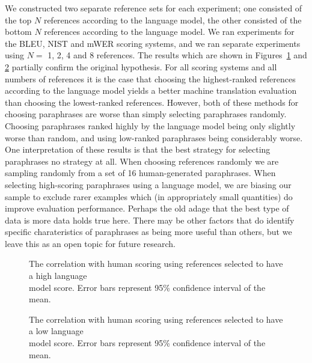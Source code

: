 We constructed two separate reference sets for each experiment; one consisted of the top $N$ references
according to the language model, the other consisted of the bottom $N$ references according to the language
model. We ran experiments for the BLEU, NIST and mWER scoring systems, and we ran separate experiments using $N
=$ 1, 2, 4 and 8 references.  The results which are shown in Figures~\ref{fig:mini_lm} and
\ref{fig:mini_lm_evil} partially confirm the original hypothesis.  For all scoring systems and all numbers of
references it is the case that choosing the highest-ranked references according to the language model yields a
better machine translation evaluation than choosing the lowest-ranked references. However, both of these methods
for choosing paraphrases are worse than simply selecting paraphrases randomly. Choosing paraphrases ranked
highly by the language model being only slightly worse than random, and using low-ranked paraphrases being
considerably worse. One interpretation of these results is that the best strategy for selecting paraphrases no
strategy at all. When choosing references randomly we are sampling randomly from a set of 16 human-generated
paraphrases. When selecting high-scoring paraphrases using a language model, we are biasing our sample to
exclude rarer examples which (in appropriately small quantities) do improve evaluation performance. Perhaps the
old adage that the best type of data is more data holds true here. There may be other factors that do identify
specific charateristics of paraphrases as being more useful than others, but we leave this as an open topic for
future research.

\begin{figure} 
\begin{center}
\textwidth
\mbox{}
\end{center}
\caption{
The correlation with human scoring using references selected to have a high language \\
model score. Error bars represent 95\% confidence interval of the mean.}
\label{fig:mini_lm}
\end{figure}

\begin{figure} 
\begin{center}
\textwidth
\mbox{}
\end{center}
\caption{
The correlation with human scoring using references selected to have a low language \\
model score. Error bars represent 95\% confidence interval of the mean.}
\label{fig:mini_lm_evil}
\end{figure}

